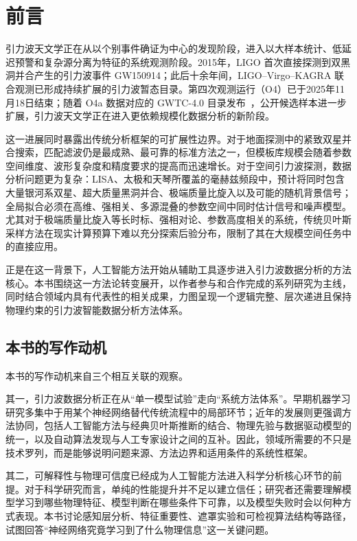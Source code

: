 \chapter*{前言}
\ifdefined\HCode\else{}\fi
\pagestyle{mystyle}

引力波天文学正在从以个别事件确证为中心的发现阶段，进入以大样本统计、低延迟预警和复杂源分离为特征的系统观测阶段。2015年，LIGO 首次直接探测到双黑洞并合产生的引力波事件 GW150914；此后十余年间，LIGO--Virgo--KAGRA 联合观测已形成持续扩展的引力波暂态目录。第四次观测运行（O4）已于2025年11月18日结束；随着 O4a 数据对应的 GWTC-4.0 目录发布~\cite{Abac2025GWTC4}，公开候选样本进一步扩展，引力波天文学正在进入更依赖规模化数据分析的新阶段。

这一进展同时暴露出传统分析框架的可扩展性边界。对于地面探测中的紧致双星并合搜索，匹配滤波仍是最成熟、最可靠的标准方法之一，但模板库规模会随着参数空间维度、波形复杂度和精度要求的提高而迅速增长。对于空间引力波探测，数据分析问题更为复杂：LISA、太极和天琴所覆盖的毫赫兹频段中，预计将同时包含大量银河系双星、超大质量黑洞并合、极端质量比旋入以及可能的随机背景信号；全局拟合必须在高维、强相关、多源混叠的参数空间中同时估计信号和噪声模型。尤其对于极端质量比旋入等长时标、强相对论、参数高度相关的系统，传统贝叶斯采样方法在现实计算预算下难以充分探索后验分布，限制了其在大规模空间任务中的直接应用。

正是在这一背景下，人工智能方法开始从辅助工具逐步进入引力波数据分析的方法核心。本书围绕这一方法论转变展开，以作者参与和合作完成的系列研究为主线，同时结合领域内具有代表性的相关成果，力图呈现一个逻辑完整、层次递进且保持物理约束的引力波智能数据分析方法体系。

\section*{本书的写作动机}

本书的写作动机来自三个相互关联的观察。

其一，引力波数据分析正在从“单一模型试验”走向“系统方法体系”。早期机器学习研究多集中于用某个神经网络替代传统流程中的局部环节；近年的发展则更强调方法协同，包括人工智能方法与经典贝叶斯推断的结合、物理先验与数据驱动模型的统一，以及自动算法发现与人工专家设计之间的互补。因此，领域所需要的不只是技术罗列，而是能够说明问题来源、方法边界和适用条件的系统性框架。

其二，可解释性与物理可信度已经成为人工智能方法进入科学分析核心环节的前提。对于科学研究而言，单纯的性能提升并不足以建立信任；研究者还需要理解模型学习到哪些物理特征、模型判断在哪些条件下可靠，以及模型失败时会以何种方式表现。本书讨论感知层分析、特征重要性、遮罩实验和可检视算法结构等路径，试图回答“神经网络究竟学习到了什么物理信息”这一关键问题。

